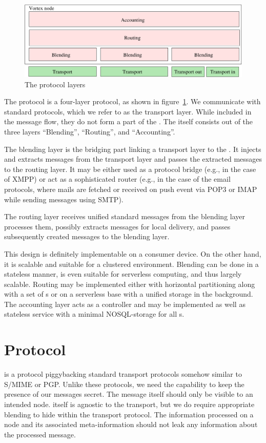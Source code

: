 \begin{figure}[ht]
	\includegraphics[width=\textwidth]{inc/layerDesign}
	\caption{The protocol layers}
	\label{fig:protocolLayers}
\end{figure}

The protocol is a four-layer protocol, as shown in figure~\ref{fig:protocolLayers}. We communicate with standard protocols, which we refer to as the transport layer. While included in the message flow, they do not form a part of the \VortexNode. The \VortexNode{} itself consists out of the three layers ``Blending'', ``Routing'', and ``Accounting''.

The blending layer is the bridging part linking a transport layer to the \VortexNode{}. It injects and extracts messages from the transport layer and passes the extracted messages to the routing layer. It may be either used as a protocol bridge (e.g., in the case of XMPP) or act as a sophisticated router (e.g., in the case of the email protocols, where mails are fetched or received on push event via POP3 or IMAP while sending messages using SMTP).

The routing layer receives unified standard messages from the blending layer processes them, possibly extracts messages for local delivery, and passes subsequently created messages to the blending layer.

This design is definitely implementable on a consumer device. On the other hand, it is scalable and suitable for a clustered environment. Blending can be done in a stateless manner, is even suitable for serverless computing, and thus largely scalable. Routing may be implemented either with horizontal partitioning along with a set of s or on a serverless base with a unified storage in the background. The accounting layer acts as a controller and may be implemented as well as stateless service with a minimal NOSQL-storage for all s. 

\chapter{Protocol}\label{sec:protocol}
\MessageVortex{} is a protocol piggybacking standard transport protocols somehow similar to S/MIME\cite{RFC2015} or PGP\cite{PGP}. Unlike these protocols, we need the capability to keep the presence of our messages secret.  The message itself should only be visible to an intended node.\MessageVortex{} itself is agnostic to the transport, but we do require appropriate blending to hide within the transport protocol. The information processed on a node and its associated meta-information should not leak any information about the processed message. 


